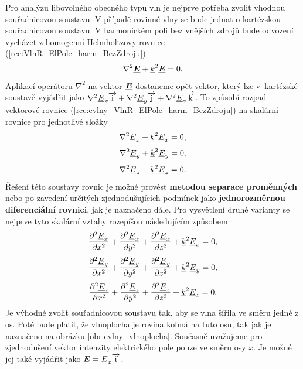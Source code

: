 Pro analýzu libovolného obecného typu vln je nejprve potřeba zvolit vhodnou souřadnicovou soustavu. V případě rovinné vlny se bude jednat o kartézskou souřadnicovou soustavu. V harmonickém poli bez vnějších zdrojů bude odvození vycházet z homogenní Helmholtzovy rovnice (\ref{rce:VlnR_ElPole_harm_BezZdroju})
\begin{equation}
	\nabla^{2}\mbox{\underline{\boldmath$E$}} + {\underline{k}}^{2}\mbox{\underline{\boldmath$E$}} = 0.
	\label{rce:evlny_VlnR_ElPole_harm_BezZdroju}
\end{equation}
Aplikací operátoru $\nabla^{2}$ na vektor $\mbox{\underline{\boldmath$E$}}$ dostaneme opět vektor, který lze v~kartézské soustavě vyjádřit jako $\nabla^{2}{\underline{E}}_{x}\overrightarrow{\mathrm{i}} + \nabla^{2} {\underline{E}}_{y}\overrightarrow{\mathrm{j}} + \nabla^{2}{\underline{E}}_{z}\overrightarrow{\mathrm{k}}$. To způsobí rozpad vektorové rovnice (\ref{rce:evlny_VlnR_ElPole_harm_BezZdroju}) na skalární rovnice pro jednotlivé složky
\begin{displaymath}
	\nabla^{2} {\underline{E}}_{x} +{\underline{k}}^{2} {\underline{E}}_{x} = 0,
\end{displaymath}
\begin{displaymath}
	\nabla^{2} {\underline{E}}_{y} +{\underline{k}}^{2} {\underline{E}}_{y} = 0,
\end{displaymath}
\begin{displaymath}
	\nabla^{2} {\underline{E}}_{z} +{\underline{k}}^{2} {\underline{E}}_{z} = 0.
\end{displaymath}
Řešení této soustavy rovnic je možné provést {\bf metodou separace proměnných} nebo po zavedení určitých zjednodušujících podmínek jako {\bf jednorozměrnou diferenciální rovnici}, jak je naznačeno dále. Pro vysvětlení druhé varianty se nejprve tyto skalární vztahy rozepíšou následujícím způsobem
\begin{equation}
	\frac{\partial ^{2} {\underline{E}}_{x}}{\partial x^{2}} + \frac{\partial ^{2}{\underline{E}}_{x}}{\partial y^{2}} + \frac{\partial ^{2}{\underline{E}}_{x}}{\partial z^{2}} + {\underline{k}}^{2} {\underline{E}}_{x} = 0,
	\label{rce:evlny_skalarni1}
\end{equation}
\begin{equation}
	\frac{\partial ^{2} {\underline{E}}_{y}}{\partial x^{2}} + \frac{\partial ^{2} {\underline{E}}_{y}}{\partial y^{2}} + \frac{\partial ^{2} {\underline{E}}_{y}}{\partial z^{2}} + {\underline{k}}^{2} {\underline{E}}_{y} = 0,
	\label{rce:evlny_skalarni2}
\end{equation}
\begin{equation}
	\frac{\partial ^{2} {\underline{E}}_{z}}{\partial x^{2}} + \frac{\partial ^{2} {\underline{E}}_{z}}{\partial y^{2}} + \frac{\partial ^{2} {\underline{E}}_{z}}{\partial z^{2}} + {\underline{k}}^{2} {\underline{E}}_{z} = 0.
	\label{rce:evlny_skalarni3}	
\end{equation}
Je výhodné zvolit souřadnicovou soustavu tak, aby se vlna šířila ve směru jedné z os. Poté bude platit, že vlnoplocha je rovina kolmá na tuto osu, tak jak je naznačeno na obrázku \ref{obr:evlny_vlnoplocha}. Současně uvažujeme pro zjednodušení vektor intenzity elektrického pole pouze ve směru osy $x$. Je možné jej také vyjádřit jako $\mbox{\underline{\boldmath$E$}} = {\underline{E}}_{x}\overrightarrow{\mathrm{i}}$.

